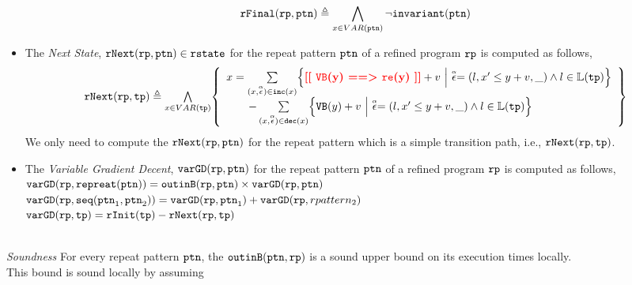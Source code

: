 \begin{itemize}
\[
  \mathtt{rFinal}(\mathtt{rp}, \mathtt{ptn}) \triangleq 
  \bigwedge_{x \in VAR(\mathtt{ptn})}
  \neg \mathtt{invariant}(\mathtt{ptn})
  \]
\item The \emph{Next State}, $\mathtt{rNext}(\mathtt{rp}, \mathtt{ptn}) \in \mathtt{rstate}$ for the repeat pattern $\mathtt{ptn}$ of a refined program $\mathtt{rp}$ is computed as follows,
%
\[
  \begin{array}{l}
  \rfnext(\rprog, \tpath) \triangleq 
  \bigwedge\limits_{x \in VAR(\tpath)}
  \left\{ 
    \begin{array}{l}
  x =   \sum\limits_{(x, \absevent) \in \inc(x) }
  \left\{ 
    \todo{\varinvar(y) ==> \reset(y)}+ v ~\middle\vert~ \absevent = (l, x' \leq y + v, \_) \land l \in \lvar(\tpath)\right\}
    \\ \qquad 
    - \sum\limits_{(x, \absevent) \in \dec(x) }\left\{ 
      \varinvar(y) + v ~\middle\vert~ \absevent = (l, x' \leq y + v, \_) \land l \in \lvar(\tpath) \right\}
    \end{array}
  \right\}
  \end{array}
\]
We only need to compute the $\mathtt{rNext}(\mathtt{rp}, \mathtt{ptn})$ for the repeat pattern which is a simple transition path,
i.e., $\mathtt{rNext}(\mathtt{rp}, \mathtt{tp})$.
\item  The \emph{Variable Gradient Decent}, $\mathtt{varGD}(\mathtt{rp}, \mathtt{ptn})$ for the repeat pattern $\mathtt{ptn}$ of a refined program $\mathtt{rp}$ is computed as follows,
\\
{$\mathtt{varGD}(\mathtt{rp}, \mathtt{repreat}(\mathtt{ptn})) =  \mathtt{outinB}(\mathtt{rp}, \mathtt{ptn}) \times {\ensuremath{\mathtt{varGD}}(\ensuremath{\mathtt{rp}}, \ensuremath{\mathtt{ptn}})}$}
\\
$\mathtt{varGD}(\mathtt{rp}, \mathtt{seq}(\mathtt{ptn}_1, \mathtt{ptn}_2)) =  \mathtt{varGD}(\mathtt{rp}, \mathtt{ptn}_1)+ \mathtt{varGD}(\mathtt{rp}, rpattern_2)$
\\
$\mathtt{varGD}(\mathtt{rp}, \mathtt{tp}) =  \mathtt{rInit}(\mathtt{tp}) - \mathtt{rNext}(\mathtt{rp}, \mathtt{tp})$
\end{itemize}
\\
\emph{Soundness} For every repeat pattern $\mathtt{ptn}$, the $\mathtt{outinB}(\mathtt{ptn}, \mathtt{rp})$
is a sound upper bound on its execution times locally.
\\
This bound is sound locally by assuming
